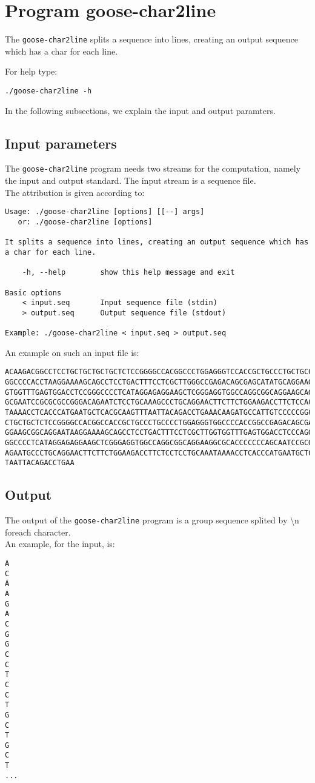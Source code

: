 \section{Program goose-char2line}
The \texttt{goose-char2line} splits a sequence into lines, creating an output sequence which has a char for each line.

For help type:
\begin{lstlisting}
./goose-char2line -h
\end{lstlisting}
In the following subsections, we explain the input and output paramters.

\subsection*{Input parameters}

The \texttt{goose-char2line} program needs two streams for the computation,
namely the input and output standard. The input stream is a sequence file.\\
The attribution is given according to:
\begin{lstlisting}
Usage: ./goose-char2line [options] [[--] args]
   or: ./goose-char2line [options]

It splits a sequence into lines, creating an output sequence which has a char for each line.

    -h, --help        show this help message and exit

Basic options
    < input.seq       Input sequence file (stdin)
    > output.seq      Output sequence file (stdout)

Example: ./goose-char2line < input.seq > output.seq
\end{lstlisting}
An example on such an input file is:
\begin{lstlisting}
ACAAGACGGCCTCCTGCTGCTGCTGCTCTCCGGGGCCACGGCCCTGGAGGGTCCACCGCTGCCCTGCTGCCATTGTCCCC
GGCCCCACCTAAGGAAAAGCAGCCTCCTGACTTTCCTCGCTTGGGCCGAGACAGCGAGCATATGCAGGAAGCGGCAGGAA
GTGGTTTGAGTGGACCTCCGGGCCCCTCATAGGAGAGGAAGCTCGGGAGGTGGCCAGGCGGCAGGAAGCAGGCCAGTGCC
GCGAATCCGCGCGCCGGGACAGAATCTCCTGCAAAGCCCTGCAGGAACTTCTTCTGGAAGACCTTCTCCACCCCCCCAGC
TAAAACCTCACCCATGAATGCTCACGCAAGTTTAATTACAGACCTGAAACAAGATGCCATTGTCCCCCGGCCTCCTGCTG
CTGCTGCTCTCCGGGGCCACGGCCACCGCTGCCCTGCCCCTGGAGGGTGGCCCCACCGGCCGAGACAGCGAGCATATGCA
GGAAGCGGCAGGAATAAGGAAAAGCAGCCTCCTGACTTTCCTCGCTTGGTGGTTTGAGTGGACCTCCCAGGCCAGTGCCG
GGCCCCTCATAGGAGAGGAAGCTCGGGAGGTGGCCAGGCGGCAGGAAGGCGCACCCCCCCAGCAATCCGCGCGCCGGGAC
AGAATGCCCTGCAGGAACTTCTTCTGGAAGACCTTCTCCTCCTGCAAATAAAACCTCACCCATGAATGCTCACGCAAGTT
TAATTACAGACCTGAA
\end{lstlisting}

\subsection*{Output}
The output of the \texttt{goose-char2line} program is a group sequence splited by \textbackslash n foreach character.\\
An example, for the input, is:
\begin{lstlisting}
A
C
A
A
G
A
C
G
G
C
C
T
C
C
T
G
C
T
G
C
T
...
\end{lstlisting}